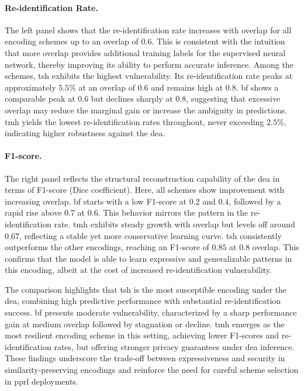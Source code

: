 \paragraph{Re-identification Rate.}
The left panel shows that the re-identification rate increases with overlap for all encoding schemes up to an overlap of $0.6$.
This is consistent with the intuition that more overlap provides additional training labels for the supervised neural network, thereby improving its ability to perform accurate inference.
Among the schemes, \ac{tsh} exhibits the highest vulnerability.
Its re-identification rate peaks at approximately $5.5\%$ at an overlap of $0.6$ and remains high at $0.8$.
\ac{bf} shows a comparable peak at $0.6$ but declines sharply at $0.8$, suggesting that excessive overlap may reduce the marginal gain or increase the ambiguity in predictions.
\ac{tmh} yields the lowest re-identification rates throughout, never exceeding $2.5\%$, indicating higher robustness against the \ac{dea}.

\paragraph{F1-score.}
The right panel reflects the structural reconstruction capability of the \ac{dea} in terms of F1-score (Dice coefficient).
Here, all schemes show improvement with increasing overlap.
\ac{bf} starts with a low F1-score at $0.2$ and $0.4$, followed by a rapid rise above $0.7$ at $0.6$.
This behavior mirrors the pattern in the re-identification rate.
\ac{tmh} exhibits steady growth with overlap but levels off around $0.67$, reflecting a stable yet more conservative learning curve.
\ac{tsh} consistently outperforms the other encodings, reaching an F1-score of $0.85$ at $0.8$ overlap.
This confirms that the model is able to learn expressive and generalizable patterns in this encoding, albeit at the cost of increased re-identification vulnerability.

The comparison highlights that \ac{tsh} is the most susceptible encoding under the \ac{dea}, combining high predictive performance with substantial re-identification success.
\ac{bf} presents moderate vulnerability, characterized by a sharp performance gain at medium overlap followed by stagnation or decline.
\ac{tmh} emerges as the most resilient encoding scheme in this setting, achieving lower F1-scores and re-identification rates, but offering stronger privacy guarantees under \ac{dea} inference.
These findings underscore the trade-off between expressiveness and security in similarity-preserving encodings and reinforce the need for careful scheme selection in \ac{pprl} deployments.


